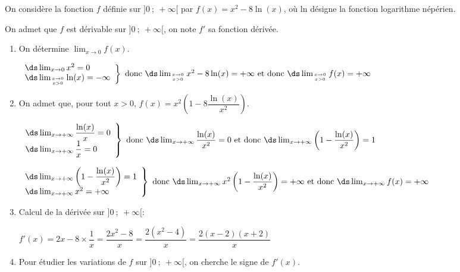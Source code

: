 \medskip

On considère la fonction $f$ définie sur $]0~;~+\infty[$ par 
$f(x) = x^2 - 8\ln (x)$,
où ln désigne la fonction logarithme népérien.

On admet que $f$ est dérivable sur $]0~;~+\infty[$, on note $f'$ sa fonction dérivée. 

\medskip

\begin{enumerate}
\item On détermine $\displaystyle\lim_{x \to 0} f(x)$.

$\left .
\begin{array}{l}
\ds\lim_{x \to 0} x^2 =0\\
\ds\lim_{x \to 0 \atop x>0} \ln(x)=-\infty
\end{array}
\right \}
\text{ donc }
\ds\lim_{x \to 0\atop x>0} x^2 -8\ln(x)=+\infty
\text{ et donc }
\ds\lim_{x \to 0\atop x>0} f(x)=+\infty$


\item On admet que, pour tout $x > 0$,\: $f(x) = x^2\left(1 - 8\dfrac{\ln (x)}{x^2}\right)$.


$\left .
\begin{array}{l}
\ds\lim_{x \to +\infty} \dfrac{\ln(x)}{x} =0\\
\ds\lim_{x \to +\infty} \dfrac{1}{x}=0 
\end{array}
\right \}
\text{ donc }
\ds\lim_{x \to +\infty} \dfrac{\ln(x)}{x^2} =0
\text{ et donc }
\ds\lim_{x \to +\infty} \left ( 1-\dfrac{\ln(x)}{x^2}\right ) =1$

$\left .
\begin{array}{l}
\ds\lim_{x \to +\infty}  \left ( 1-\dfrac{\ln(x)}{x^2}\right ) =1\\
\ds\lim_{x \to +\infty} x^2=+\infty
\end{array}
\right \}
\text{ donc }
\ds\lim_{x \to +\infty}  x^2\left ( 1-\dfrac{\ln(x)}{x^2}\right ) =+\infty
\text{ et donc }
\ds\lim_{x \to +\infty}  f(x) =+\infty$

\item 
Calcul de la dérivée sur $]0~;~+\infty[$:

$f'(x)=2x -8\times \dfrac{1}{x}=\dfrac{2x^2-8}{x}=\dfrac{2\left (x^2-4\right )}{x}
=\dfrac{2(x-2)(x+2)}{x}$

\item Pour étudier les variations de $f$ sur $]0~;~+\infty[$, on cherche le signe de $f'(x)$.


\end{enumerate}
